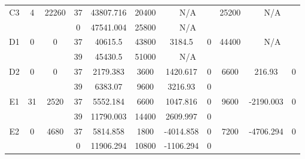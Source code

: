 \begin{sidewaystable}
\begin{tabular}{c||c|c||c|c|c|c|c||c|c|c}
         &
        
      \\
      \hline
      \multirow{2}{*}{C3} &
      \multirow{2}{*}{4} &
      \multirow{2}{*}{22260} &
      37 &
      43807.716 &
      20400 &
        \multicolumn{2}{|c||}{N/A} &
      \multirow{2}{*}{25200} &
        \multicolumn{2}{c}{\multirow{2}{*}{N/A}}
      \\
      \cline{4-8}
       &
       &
       &
      0 &
      47541.004 &
      25800 &
        \multicolumn{2}{|c||}{N/A} &
      
        
      \\
      \hline
      \multirow{2}{*}{D1} &
      \multirow{2}{*}{0} &
      \multirow{2}{*}{0} &
      37 &
      40615.5 &
      43800 &
        3184.5 &
        0 &
      \multirow{2}{*}{44400} &
        \multicolumn{2}{c}{\multirow{2}{*}{N/A}}
      \\
      \cline{4-8}
       &
       &
       &
      39 &
      45430.5 &
      51000 &
        \multicolumn{2}{|c||}{N/A} &
      
        
      \\
      \hline
      \multirow{2}{*}{D2} &
      \multirow{2}{*}{0} &
      \multirow{2}{*}{0} &
      37 &
      2179.383 &
      3600 &
        1420.617 &
        0 &
      \multirow{2}{*}{6600} &
        \multirow{2}{*}{216.93} &
        \multirow{2}{*}{0}
      \\
      \cline{4-8}
       &
       &
       &
      39 &
      6383.07 &
      9600 &
        3216.93 &
        0 &
      
         &
        
      \\
      \hline
      \multirow{2}{*}{E1} &
      \multirow{2}{*}{31} &
      \multirow{2}{*}{2520} &
      37 &
      5552.184 &
      6600 &
        1047.816 &
        0 &
      \multirow{2}{*}{9600} &
        \multirow{2}{*}{-2190.003} &
        \multirow{2}{*}{0}
      \\
      \cline{4-8}
       &
       &
       &
      39 &
      11790.003 &
      14400 &
        2609.997 &
        0 &
      
         &
        
      \\
      \hline
      \multirow{2}{*}{E2} &
      \multirow{2}{*}{0} &
      \multirow{2}{*}{4680} &
      37 &
      5814.858 &
      1800 &
        -4014.858 &
        0 &
      \multirow{2}{*}{7200} &
        \multirow{2}{*}{-4706.294} &
        \multirow{2}{*}{0}
      \\
      \cline{4-8}
       &
       &
       &
      0 &
      11906.294 &
      10800 &
        -1106.294 &
        0 &
      

\end{tabular}
\end{sidewaystable}
